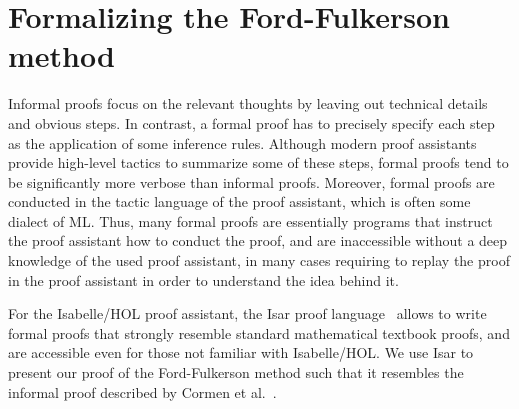 \documentclass{llncs}
\begin{document}
\section{Formalizing the Ford-Fulkerson method}\label{sec:abs-formalization}
%
%    
%      
%    
%    


Informal proofs focus on the relevant thoughts by leaving out technical details and obvious steps. 
In contrast, a formal proof has to precisely specify each step as the application of some inference rules. 
Although modern proof assistants provide high-level tactics to summarize some of these steps, formal proofs tend to be significantly more 
verbose than informal proofs. Moreover, formal proofs are conducted in the tactic language of the proof assistant, which is often some dialect of ML. 
Thus, many formal proofs are essentially programs that instruct the proof assistant how to conduct the proof, and are inaccessible without a deep knowledge of the used proof assistant, in many cases requiring to replay the proof in the proof assistant in order to understand the idea behind it.

For the Isabelle/HOL proof assistant, the Isar proof language~\cite{Wenzel99} allows to write formal proofs that strongly resemble standard mathematical textbook proofs, and are accessible even for those not familiar with Isabelle/HOL. 
We use Isar to present our proof of the Ford-Fulkerson method such that it resembles the informal proof described by Cormen et al.~\cite{CLRS09}.
\end{document}

